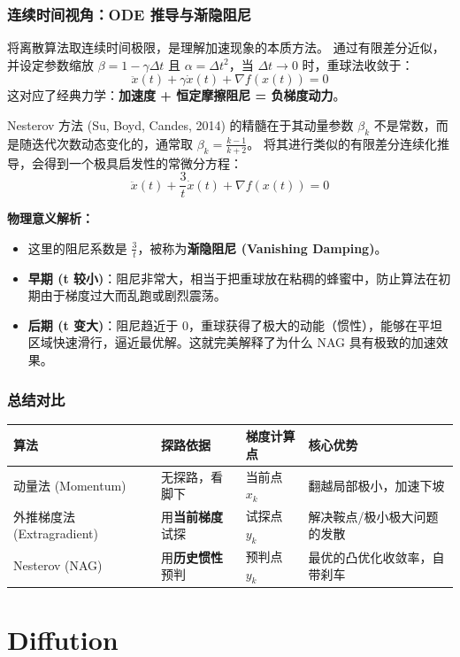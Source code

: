 \subsection{连续时间视角：ODE 推导与渐隐阻尼}
将离散算法取连续时间极限，是理解加速现象的本质方法。
通过有限差分近似，并设定参数缩放 $\beta = 1 - \gamma \Delta t$ 且 $\alpha = \Delta t^2$，当 $\Delta t \to 0$ 时，重球法收敛于：
$$\ddot{x}(t) + \gamma \dot{x}(t) + \nabla f(x(t)) = 0$$
这对应了经典力学：\textbf{加速度 + 恒定摩擦阻尼 = 负梯度动力}。


Nesterov 方法 (Su, Boyd, Candes, 2014) 的精髓在于其动量参数 $\beta_k$ 不是常数，而是随迭代次数动态变化的，通常取 $\beta_k = \frac{k-1}{k+2}$。
将其进行类似的有限差分连续化推导，会得到一个极具启发性的常微分方程：
$$\ddot{x}(t) + \frac{3}{t} \dot{x}(t) + \nabla f(x(t)) = 0$$

\textbf{物理意义解析：}
\begin{itemize}
    \item 这里的阻尼系数是 $\frac{3}{t}$，被称为\textbf{渐隐阻尼 (Vanishing Damping)}。
    \item \textbf{早期 (t 较小)}：阻尼非常大，相当于把重球放在粘稠的蜂蜜中，防止算法在初期由于梯度过大而乱跑或剧烈震荡。
    \item \textbf{后期 (t 变大)}：阻尼趋近于 0，重球获得了极大的动能（惯性），能够在平坦区域快速滑行，逼近最优解。这就完美解释了为什么 NAG 具有极致的加速效果。
\end{itemize}

\subsection{总结对比}

\begin{table}[htbp]
    \centering
    \begin{tabular}{llll}
        \toprule
        \textbf{算法} & \textbf{探路依据} & \textbf{梯度计算点} & \textbf{核心优势} \\
        \midrule
        动量法 (Momentum) & 无探路，看脚下 & 当前点 $x_k$ & 翻越局部极小，加速下坡 \\
        外推梯度法 (Extragradient) & 用\textbf{当前梯度}试探 & 试探点 $y_k$ & 解决鞍点/极小极大问题的发散 \\
        Nesterov (NAG) & 用\textbf{历史惯性}预判 & 预判点 $y_k$ & 最优的凸优化收敛率，自带刹车 \\
        \bottomrule
    \end{tabular}
\end{table}
\chapter{Diffution}

